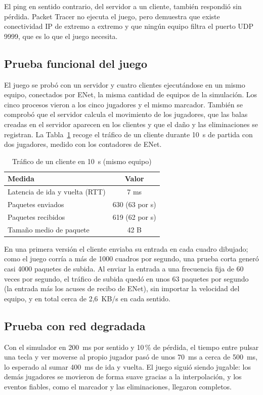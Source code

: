 \documentclass[conference]{IEEEtran}
\begin{document}
El ping en sentido contrario, del servidor a un cliente, también respondió sin
pérdida. Packet Tracer no ejecuta el juego, pero demuestra que existe
conectividad IP de extremo a extremo y que ningún equipo filtra el puerto UDP
9999, que es lo que el juego necesita.

\subsection{Prueba funcional del juego}
El juego se probó con un servidor y cuatro clientes ejecutándose en un mismo
equipo, conectados por ENet, la misma cantidad de equipos de la simulación. Los
cinco procesos vieron a los cinco jugadores y el mismo marcador. También se
comprobó que el servidor calcula el movimiento de los jugadores, que las balas
creadas en el servidor aparecen en los clientes y que el daño y las
eliminaciones se registran. La Tabla~\ref{tab:medidas} recoge el tráfico de un
cliente durante 10~s de partida con dos jugadores, medido con los contadores de
ENet.

\begin{table}[htbp]
\caption{Tráfico de un cliente en 10~s (mismo equipo)}
\label{tab:medidas}
\centering
\begin{tabular}{|l|c|}
\hline
\textbf{Medida} & \textbf{Valor} \\
\hline
Latencia de ida y vuelta (RTT) & 7 ms \\
Paquetes enviados & 630 (63 por s) \\
Paquetes recibidos & 619 (62 por s) \\
Tamaño medio de paquete & 42 B \\
\hline
\end{tabular}
\end{table}

En una primera versión el cliente enviaba su entrada en cada cuadro dibujado;
como el juego corría a más de 1000 cuadros por segundo, una prueba corta generó
casi 4000 paquetes de subida. Al enviar la entrada a una frecuencia fija de 60
veces por segundo, el tráfico de subida quedó en unos 63 paquetes por segundo
(la entrada más los acuses de recibo de ENet), sin importar la velocidad del
equipo, y en total cerca de 2,6~KB/s en cada sentido.

\subsection{Prueba con red degradada}
Con el simulador en 200~ms por sentido y 10\,\% de pérdida, el tiempo entre
pulsar una tecla y ver moverse al propio jugador pasó de unos 70~ms a cerca de
500~ms, lo esperado al sumar 400~ms de ida y vuelta. El juego siguió siendo
jugable: los demás jugadores se movieron de forma suave gracias a la
interpolación, y los eventos fiables, como el marcador y las eliminaciones,
llegaron completos.
\end{document}
